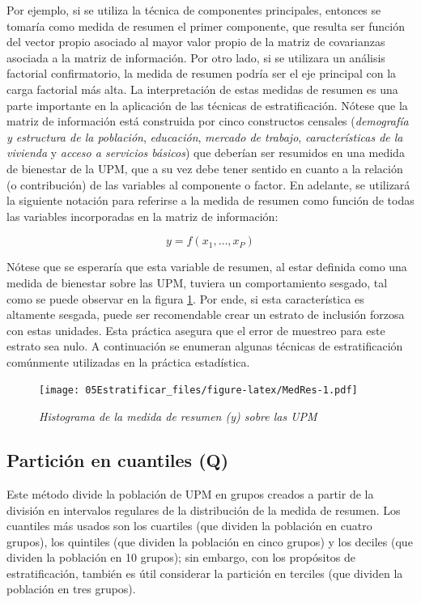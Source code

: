 \documentclass[
  12pt,
]{book}
\begin{document}
Por ejemplo, si se utiliza la técnica de componentes principales, entonces se tomaría como medida de resumen el primer componente, que resulta ser función del vector propio asociado al mayor valor propio de la matriz de covarianzas asociada a la matriz de información. Por otro lado, si se utilizara un análisis factorial confirmatorio, la medida de resumen podría ser el eje principal con la carga factorial más alta. La interpretación de estas medidas de resumen es una parte importante en la aplicación de las técnicas de estratificación. Nótese que la matriz de información está construida por cinco constructos censales (\emph{demografía y estructura de la población}, \emph{educación}, \emph{mercado de trabajo}, \emph{características de la vivienda} y \emph{acceso a servicios básicos}) que deberían ser resumidos en una medida de bienestar de la UPM, que a su vez debe tener sentido en cuanto a la relación (o contribución) de las variables al componente o factor. En adelante, se utilizará la siguiente notación para referirse a la medida de resumen como función de todas las variables incorporadas en la matriz de información:

\[
y = f(x_1,\ldots, x_P)
\]

Nótese que se esperaría que esta variable de resumen, al estar definida como una medida de bienestar sobre las UPM, tuviera un comportamiento sesgado, tal como se puede observar en la figura \ref{fig:MedRes}. Por ende, si esta característica es altamente sesgada, puede ser recomendable crear un estrato de inclusión forzosa con estas unidades. Esta práctica asegura que el error de muestreo para este estrato sea nulo. A continuación se enumeran algunas técnicas de estratificación comúnmente utilizadas en la práctica estadística.

\begin{figure}
\centering
\texttt{[image: 05Estratificar\_files/figure-latex/MedRes-1.pdf]}
\caption{\label{fig:MedRes}\emph{Histograma de la medida de resumen (y) sobre las UPM}}
\end{figure}

\hypertarget{particiuxf3n-en-cuantiles-q}{%
\subsection{Partición en cuantiles (Q)}\label{particiuxf3n-en-cuantiles-q}}

Este método divide la población de UPM en grupos creados a partir de la división en intervalos regulares de la distribución de la medida de resumen. Los cuantiles más usados son los cuartiles (que dividen la población en cuatro grupos), los quintiles (que dividen la población en cinco grupos) y los deciles (que dividen la población en 10 grupos); sin embargo, con los propósitos de estratificación, también es útil considerar la partición en terciles (que dividen la población en tres grupos).
\end{document}
